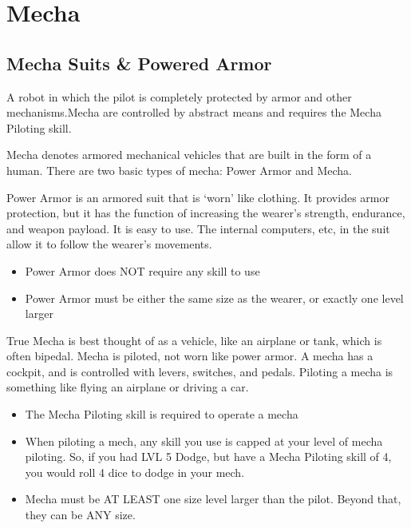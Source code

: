 \documentclass[twoside]{book}
\begin{document}
    

\chapter{Mecha}
    
    

\section{Mecha Suits \& Powered Armor}
    
    {  
      A robot in which the pilot is completely protected by
             armor and other mechanisms.Mecha are controlled by abstract
             means and requires the Mecha Piloting skill. 
    }
  
    {  
      Mecha denotes armored mechanical vehicles that are
             built in the form of a human. There are two basic types of
             mecha: Power Armor and Mecha. 
    }
  
    {  
      Power Armor is an armored suit that is
             `worn' like clothing. It provides armor
             protection, but it has the function of increasing the
             wearer's strength, endurance, and weapon payload. It
             is easy to use. The internal computers, etc, in the suit
             allow it to follow the wearer's movements. 
    }
  
\begin{itemize}
      
  \item  Power Armor does NOT require any skill to use
               
  \item  Power Armor must be either the same size as the
               wearer, or exactly one level larger 
\end{itemize}
  
    {  
      True Mecha is best thought of as a vehicle, like an
             airplane or tank, which is often bipedal. Mecha is piloted,
             not worn like power armor. A mecha has a cockpit, and is
             controlled with levers, switches, and pedals. Piloting a
             mecha is something like flying an airplane or driving a car.
             
    }
  
\begin{itemize}
      
  \item  The Mecha Piloting skill is required to operate a
               mecha 
  \item  When piloting a mech, any skill you use is capped at
               your level of mecha piloting. So, if you had LVL 5 Dodge,
               but have a Mecha Piloting skill of 4, you would roll 4
               dice to dodge in your mech. 
  \item  Mecha must be AT LEAST one size level larger than
               the pilot. Beyond that, they can be ANY size. 
\end{itemize}
  
\end{document}
